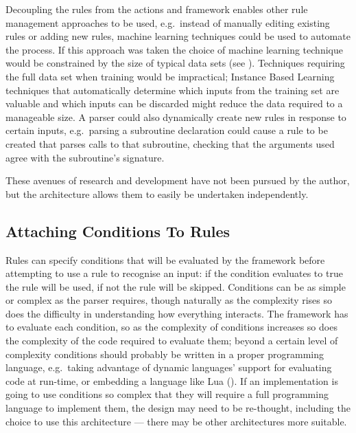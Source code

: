 Decoupling the rules from the actions and framework enables other rule
management approaches to be used, e.g.\ instead of manually editing
existing rules or adding new rules, machine learning techniques could be
used to automate the process.  If this approach was taken the choice of
machine learning technique would be constrained by the size of typical data
sets (see ).  Techniques requiring the full
data set when training would be impractical; Instance Based
Learning~\cite{instance-based-learning} techniques that automatically
determine which inputs from the training set are valuable and which inputs
can be discarded might reduce the data required to a manageable size.  A
parser could also dynamically create new rules in response to certain
inputs, e.g.\ parsing a subroutine declaration could cause a rule to be
created that parses calls to that subroutine, checking that the arguments
used agree with the subroutine's signature.

These avenues of research and development have not been pursued by the
author, but the architecture allows them to easily be undertaken
independently.

\subsection{Attaching Conditions To Rules}

\label{attaching conditions to rules}

Rules can specify conditions that will be evaluated by the framework before
attempting to use a rule to recognise an input: if the condition evaluates
to true the rule will be used, if not the rule will be skipped.  Conditions
can be as simple or complex as the parser requires, though naturally as the
complexity rises so does the difficulty in understanding how everything
interacts.  The framework has to evaluate each condition, so as the
complexity of conditions increases so does the complexity of the code
required to evaluate them; beyond a certain level of complexity conditions
should probably be written in a proper programming language, e.g.\ taking
advantage of dynamic languages' support for evaluating code at run-time, or
embedding a language like Lua
().  If an
implementation is going to use conditions so complex that they will require
a full programming language to implement them, the design may need to be
re-thought, including the choice to use this architecture --- there may be
other architectures more suitable.

